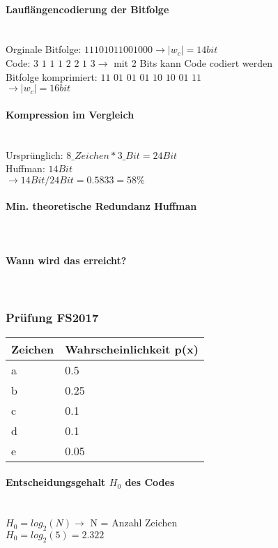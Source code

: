 \paragraph{Lauflängencodierung der Bitfolge}\mbox{}\\
Orginale Bitfolge: $11101011001000 \rightarrow |w_c| = 14 bit$\\
Code: $3$ $1$ $1$ $1$ $2$ $2$ $1$ $3 \rightarrow$ mit 2 Bits kann Code codiert werden\\
Bitfolge komprimiert: $11$ $01$ $01$ $01$ $10$ $10$ $01$ $11$\\
$\rightarrow |w_c| = 16 bit$

\paragraph{Kompression im Vergleich}\mbox{}\\
Ursprünglich: $8\_Zeichen * 3\_Bit = 24 Bit$\\
Huffman: $14 Bit$\\
$\rightarrow 14Bit/24Bit=0.5833=58\%$

\paragraph{Min. theoretische Redundanz Huffman}\mbox{}\\

\paragraph{Wann wird das erreicht?}\mbox{}\\

\subsubsection{Prüfung FS2017}
\begin{center}
    \centering
    \begin{tabular}{l | l}
        \bfseries{Zeichen} & \bfseries{Wahrscheinlichkeit p(x)}\\ \hline
        a & 0.5\\ 
        b & 0.25\\
        c & 0.1\\
        d & 0.1\\
        e & 0.05
    \end{tabular}
\end{center}

\paragraph{Entscheidungsgehalt $H_0$ des Codes}\mbox{}\\
$H_0=log_2(N) \rightarrow$ N = Anzahl Zeichen\\
$H_0=log_2(5)=2.322$

